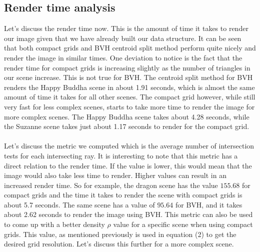 \documentclass[11pt,a4paper]{article}
\begin{document}
\subsection{Render time analysis}
Let's discuss the render time now. This is the amount of time it takes to render our image given that we have already built our data structure. It can be seen that both compact grids and BVH centroid split method perform quite nicely and render the image in similar times. One deviation to notice is the fact that the render time for compact grids is increasing slightly as the number of triangles in our scene increase. This is not true for BVH. The centroid split method for BVH renders the Happy Buddha scene in about 1.91 seconds, which is almost the same amount of time it takes for all other scenes. The compact grid however, while still very fast for less complex scenes, starts to take more time to render the image for more complex scenes. The Happy Buddha scene takes about 4.28 seconds, while the Suzanne scene takes just about 1.17 seconds to render for the compact grid.
\\~\\
Let's discuss the metric we computed which is the average number of intersection tests for each intersecting ray. It is interesting to note that this metric has a direct relation to the render time. If the value is lower, this would mean that the image would also take less time to render. Higher values can result in an increased render time. So for example, the dragon scene has the value $155.68$ for compact grids and the time it takes to render the scene with compact grids is about 5.7 seconds. The same scene has a value of $95.64$ for BVH, and it takes about 2.62 seconds to render the image using BVH. This metric can also be used to come up with a better density $\rho$ value for a specific scene when using compact grids. This value, as mentioned previously is used in equation (2) to get the desired grid resolution. Let's discuss this further for a more complex scene.
\end{document}
